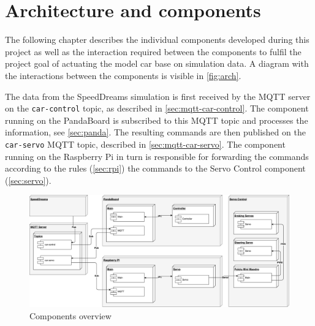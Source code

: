 \section{Architecture and components}
\label{sec:arch}
The following chapter describes the individual components developed during this project as well as the interaction required between the components to fulfil the project goal of actuating the model car base on simulation data.
A diagram with the interactions between the components is visible in \autoref{fig:arch}.

The data from the SpeedDreams simulation is first received by the MQTT server on the \texttt{car-control} topic, as described in \autoref{sec:mqtt-car-control}.
The component running on the PandaBoard is subscribed to this MQTT topic and processes the information, see \autoref{sec:panda}.
The resulting commands are then published on the \texttt{car-servo} MQTT topic, described in \autoref{sec:mqtt-car-servo}.
The component running on the Raspberry Pi in turn is responsible for forwarding the commands according to the rules (\autoref{sec:rpi}) the commands to the Servo Control component (\autoref{sec:servo}).


\begin{figure}[h]
    \centering
    \includegraphics[width=1\linewidth]{images/components}
    \caption{Components overview}
    \label{fig:arch}
\end{figure}




